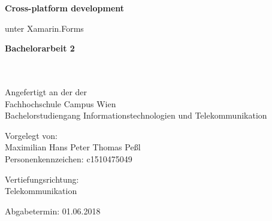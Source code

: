 \begin{center}

\vspace{1.3cm}

\hspace*{-1.0cm} {\Large \textbf{Cross-platform development\\}}

\hspace*{-1.0cm} unter Xamarin.Forms \\

\vspace{2.2cm}

\hspace*{-1.0cm} \textbf{Bachelorarbeit 2\\}

\vspace{0.65cm}

\hspace*{-1.0cm}\\
\hspace*{-1.0cm}\\
\hspace*{-1.0cm} Angefertigt an der der \\
\hspace*{-1.0cm} Fachhochschule Campus Wien \\
\hspace*{-1.0cm} Bachelorstudiengang Informationstechnologien und Telekommunikation \\

\vspace{7cm}

\hspace*{-1.0cm} Vorgelegt von: \\
\hspace*{-1.0cm} Maximilian Hans Peter Thomas Peßl \\
\hspace*{-1.0cm} Personenkennzeichen: c1510475049 \\

\vspace{2.1cm}

\hspace*{-1.0cm} Vertiefungsrichtung: \\
\hspace*{-1.0cm} Telekommunikation\\

\vspace{0.5cm}


\vspace{1.4cm}

\hspace*{-1.0cm} Abgabetermin: 01.06.2018 \\

\end{center}


